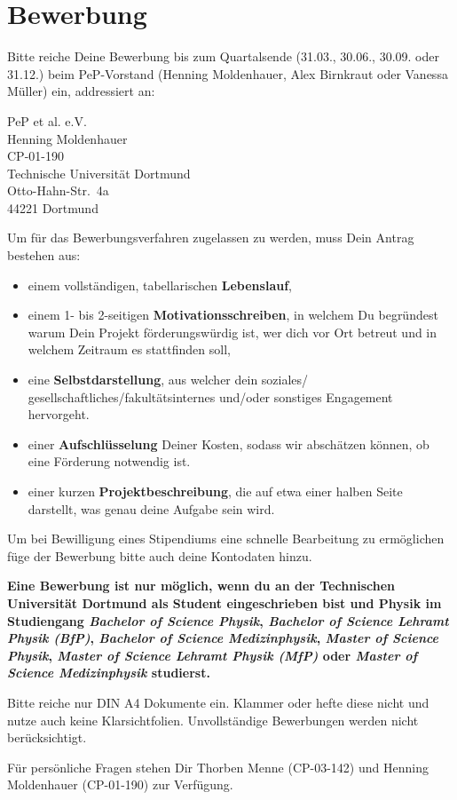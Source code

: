 \documentclass[
  paper=a4,
  fontsize=12pt,
  DIV=16,
  headheight=52pt,
  footheight=45pt,
  headinclude,
  parskip=full,
]{scrartcl}
\begin{document}
\section*{Bewerbung}

Bitte reiche Deine Bewerbung bis zum Quartalsende (31.03., 30.06.,
30.09. oder 31.12.) beim PeP-Vorstand
(Henning Moldenhauer, Alex Birnkraut oder Vanessa Müller) ein,
addressiert an:

PeP et al. e.V.\\
Henning Moldenhauer\\
CP-01-190\\[0.5\baselineskip]
Technische Universität Dortmund\\
Otto-Hahn-Str.~4a\\
44221 Dortmund

Um für das Bewerbungsverfahren zugelassen zu werden, muss Dein Antrag bestehen aus:
\begin{itemize}
  \item einem vollständigen, tabellarischen \textbf{Lebenslauf},
  \item einem 1- bis 2-seitigen \textbf{Motivationsschreiben}, in welchem Du
	  begründest warum Dein Projekt förderungswürdig ist, wer dich vor Ort
	  betreut und in welchem Zeitraum es stattfinden soll,
  \item eine \textbf{Selbstdarstellung}, aus welcher dein soziales/
	  gesellschaftliches/fakultätsinternes und/oder sonstiges Engagement hervorgeht.
  \item einer \textbf{Aufschlüsselung} Deiner Kosten, sodass wir abschätzen können,
	  ob eine Förderung notwendig ist.
  \item einer kurzen \textbf{Projektbeschreibung}, die auf etwa einer halben Seite
	  darstellt, was genau deine Aufgabe sein wird.
\end{itemize}
Um bei Bewilligung eines Stipendiums eine schnelle Bearbeitung zu ermöglichen
füge der Bewerbung bitte auch deine Kontodaten hinzu.

\textbf{%
  Eine Bewerbung ist nur möglich, wenn du an der Technischen Universität Dortmund
  als Student eingeschrieben bist und Physik im Studiengang
  \emph{Bachelor of Science Physik},
  \emph{Bachelor of Science Lehramt Physik (BfP)},
  \emph{Bachelor of Science Medizinphysik},
  \emph{Master of Science Physik},
  \emph{Master of Science Lehramt Physik (MfP)} oder
  \emph{Master of Science Medizinphysik} studierst.
}

Bitte reiche nur DIN A4 Dokumente ein. Klammer oder hefte diese nicht und nutze auch
keine Klarsichtfolien. Unvollständige Bewerbungen werden nicht berücksichtigt.

Für persönliche Fragen stehen Dir Thorben Menne (CP-03-142) und
Henning Moldenhauer (CP-01-190) zur Verfügung.
\end{document}
